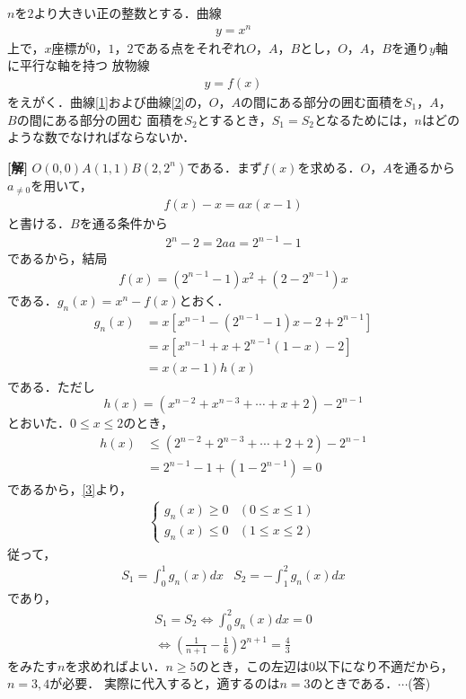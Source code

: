 \documentclass[a4j]{jarticle}
\begin{document}

     \begin{oframed}
     $n$を$2$より大きい正の整数とする．曲線
          \begin{align}
          y=x^n\tag{i}\label{1}
          \end{align}
     上で，$x$座標が$0$，$1$，$2$である点をそれぞれ$O$，$A$，$B$とし，$O$，$A$，$B$を通り$y$軸に平行な軸を持つ
     放物線
          \begin{align}
          y=f(x)\tag{ii}\label{2}
          \end{align}
     をえがく．曲線\eqref{1}および曲線\eqref{2}の，$O$，$A$の間にある部分の囲む面積を$S_1$，$A$，$B$の間にある部分の囲む
     面積を$S_2$とするとき，$S_1=S_2$となるためには，$n$はどのような数でなければならないか．
     \end{oframed}

\setlength{\columnseprule}{0.4pt}
\begin{multicols}{2}
{\bf[解]} $O(0,0)$$A(1,1)$$B(2,2^n)$である．まず$f(x)$を求める．$O$，$A$を通るから$a_{\not=0}$を用いて，
     \begin{align*}
     f(x)-x=ax(x-1)
     \end{align*}
と書ける．$B$を通る条件から
     \begin{align*}
     2^n-2=2a a=2^{n-1}-1
     \end{align*}
であるから，結局
     \begin{align*}
     f(x)=(2^{n-1}-1)x^2+(2-2^{n-1})x
     \end{align*}
である．$g_n(x)=x^n-f(x)$とおく．
     \begin{align}
     g_n(x)&=x\left[x^{n-1}-(2^{n-1}-1)x-2+2^{n-1}\right] \nonumber\\
     &=x\left[x^{n-1}+x+2^{n-1}(1-x)-2\right] \nonumber\\
     &=x(x-1)h(x) \label{3}
     \end{align}
である．ただし
      \[h(x)=(x^{n-2}+x^{n-3}+\cdots+x+2)-2^{n-1}\]
とおいた．$0\le x\le2$のとき，
     \begin{align*}
     h(x)&\le (2^{n-2}+2^{n-3}+\cdots+2+2)-2^{n-1} \\
     &=2^{n-1}-1+(1-2^{n-1})=0
     \end{align*}
であるから，\eqref{3}より，
     \begin{align*}
          \begin{cases}     
          g_n(x)\ge0&(0\le x\le1) \\
          g_n(x)\le0&(1\le x\le2)
          \end{cases}
     \end{align*}
従って，
      \begin{align*}
      S_1=\int_0^1g_n(x)dx&S_2=-\int_1^2g_n(x)dx
       \end{align*}   
であり，  
     \begin{align*}
     S_1=S_2\Longleftrightarrow \int_0^2g_n(x)dx=0 \\ 
     \Longleftrightarrow \left(\frac{1}{n+1}-\frac{1}{6}\right)2^{n+1}=\frac{4}{3}
     \end{align*}
をみたす$n$を求めればよい．$n\ge5$のとき，この左辺は$0$以下になり不適だから，$n=3,4$が必要．
実際に代入すると，適するのは$n=3$のときである．$\cdots$(答)     
\newpage
\end{multicols}
\end{document}

